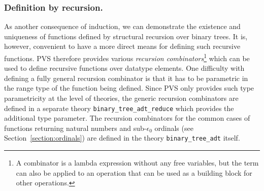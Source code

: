 \documentclass[11pt,twoside]{book}
\begin{document}
\subsubsection{Definition by recursion. } As another consequence of induction,
we can demonstrate the existence 
and uniqueness of functions defined by structural recursion over binary
trees.  It is, however, convenient to have a more direct means   
for  defining such recursive functions.  
PVS therefore provides various \emph{recursion combinators}\footnote{A combinator is a
lambda expression without any free variables, but the term can also be
applied to an operation that can be used as a building block for other
operations.} which can be
used to define recursive functions over datatype elements.  
One difficulty with
defining  a fully general recursion combinator is that it has to be
parametric in the 
range type of the function being defined.  Since PVS only provides such
type parametricity at the level of theories, 
the generic recursion combinators are defined in
a separate theory \texttt{binary\_tree\_adt\_reduce} which provides the
additional type parameter.  The recursion combinators for
the common cases of functions returning natural numbers and
sub-$\epsilon_0$ ordinals (see 
Section~\ref{section:ordinals}) are
defined in the theory \texttt{binary\_tree\_adt}
itself.
\end{document}
